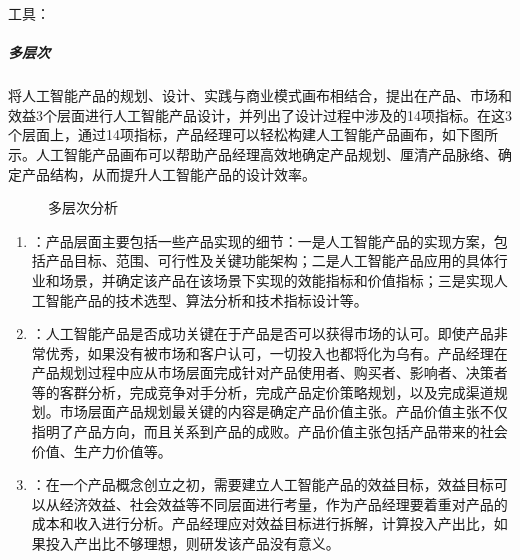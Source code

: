 \documentclass[letterpaper,11pt,english]{sphinxmanual}
\begin{document}
工具：%
\begin{footnote}[343]\sphinxAtStartFootnote
{}
%
\end{footnote}


\subparagraph{多层次}
\label{\detokenize{chapter_idea/business:id15}}
将人工智能产品的规划、设计、实践与商业模式画布相结合，提出在产品、市场和效益3个层面进行人工智能产品设计，并列出了设计过程中涉及的14项指标。在这3个层面上，通过14项指标，产品经理可以轻松构建人工智能产品画布，如下图所示。人工智能产品画布可以帮助产品经理高效地确定产品规划、厘清产品脉络、确定产品结构，从而提升人工智能产品的设计效率。
%
\begin{footnote}[344]\sphinxAtStartFootnote
{}
%
\end{footnote}

\begin{figure}[H]
\centering
\capstart

\noindent{}
\caption{多层次分析}\label{\detokenize{chapter_idea/business:id31}}\end{figure}
\begin{enumerate}
%
\item {} 
：产品层面主要包括一些产品实现的细节：一是人工智能产品的实现方案，包括产品目标、范围、可行性及关键功能架构；二是人工智能产品应用的具体行业和场景，并确定该产品在该场景下实现的效能指标和价值指标；三是实现人工智能产品的技术选型、算法分析和技术指标设计等。

\item {} 
：人工智能产品是否成功关键在于产品是否可以获得市场的认可。即使产品非常优秀，如果没有被市场和客户认可，一切投入也都将化为乌有。产品经理在产品规划过程中应从市场层面完成针对产品使用者、购买者、影响者、决策者等的客群分析，完成竞争对手分析，完成产品定价策略规划，以及完成渠道规划。市场层面产品规划最关键的内容是确定产品价值主张。产品价值主张不仅指明了产品方向，而且关系到产品的成败。产品价值主张包括产品带来的社会价值、生产力价值等。

\item {} 
：在一个产品概念创立之初，需要建立人工智能产品的效益目标，效益目标可以从经济效益、社会效益等不同层面进行考量，作为产品经理要着重对产品的成本和收入进行分析。产品经理应对效益目标进行拆解，计算投入产出比，如果投入产出比不够理想，则研发该产品没有意义。

\end{enumerate}
\end{document}
